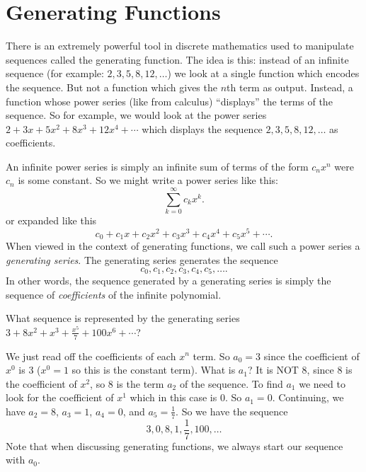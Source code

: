 \documentclass[12pt]{article}
\begin{document}
\section{Generating Functions}

There is an extremely powerful tool in discrete mathematics used to manipulate sequences called the generating function. The idea is this: instead of an infinite sequence (for example: $2, 3, 5, 8, 12, \ldots$) we look at a single function which encodes the sequence.  But not a function which gives the $n$th term as output.  Instead, a function whose power series (like from calculus) ``displays'' the terms of the sequence.  So for example, we would look at the power series $2 + 3x + 5x^2 + 8x^3 + 12x^4 + \cdots$ which displays the sequence $2, 3, 5, 8, 12, \ldots$ as coefficients.

An infinite power series is simply an infinite sum of terms of the form $c_nx^n$ were $c_n$ is some constant.  So we might write a power series like this:
\[\sum_{k=0}^\infty c_k x^k.\]
or expanded like this
\[c_0 + c_1x + c_2x^2 + c_3x^3 + c_4x^4 + c_5x^5 + \cdots.\]
When viewed in the context of generating functions, we call such a power series a {\em generating series}.  The generating series generates the sequence
\[c_0, c_1, c_2, c_3, c_4, c_5, \ldots.\]
In other words, the sequence generated by a generating series is simply the sequence of {\em coefficients} of the infinite polynomial.  

\begin{example}
 What sequence is represented by the generating series $3 + 8x^2 + x^3 + \frac{x^5}{7} + 100x^6 + \cdots$?
 \begin{solution}
  We just read off the coefficients of each $x^n$ term.  So $a_0 = 3$ since the coefficient of $x^0$ is 3 ($x^0 = 1$ so this is the constant term).  What is $a_1$?  It is NOT 8, since 8 is the coefficient of $x^2$, so 8 is the term $a_2$ of the sequence.  To find $a_1$ we need to look for the coefficient of $x^1$ which in this case is 0.  So $a_1 = 0$.  Continuing, we have $a_2 = 8$, $a_3 = 1$, $a_4 = 0$, and $a_5 = \frac{1}{7}$.  So we have the sequence
  \[3, 0, 8, 1, \frac{1}{7}, 100, \ldots\]
  Note that when discussing generating functions, we always start our sequence with $a_0$.
 \end{solution}

\end{example}
\end{document}
